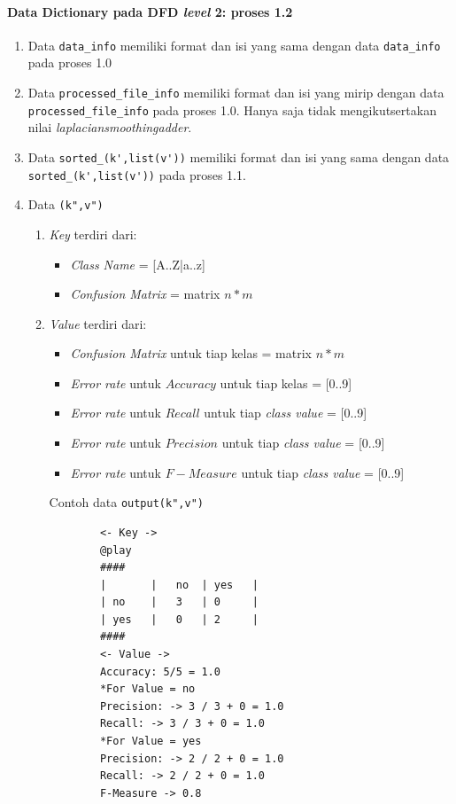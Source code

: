 \paragraph{Data Dictionary pada DFD \textit{level} 2: proses 1.2}
\begin{enumerate}
	\item Data \verb|data_info| memiliki format dan isi yang sama dengan data \verb|data_info| pada proses 1.0
	
	\item Data \verb|processed_file_info|
	memiliki format dan isi yang mirip dengan data \verb|processed_file_info| pada proses 1.0. Hanya saja tidak mengikutsertakan nilai \textit{laplaciansmoothingadder}.

	\item Data \verb|sorted_(k',list(v'))|
	memiliki format dan isi yang sama dengan data \verb|sorted_(k',list(v'))| pada proses 1.1.

	\item Data \verb|(k",v")|
	\begin{enumerate}
		\item \textit{Key} terdiri dari:
		\begin{itemize}
			\item \textit{Class Name} = [A..Z|a..z]
			\item \textit{Confusion Matrix} = matrix $n*m$
		\end{itemize}

		\item \textit{Value} terdiri dari:
		\begin{itemize}
			\item \textit{Confusion Matrix} untuk tiap kelas = matrix $n*m$
			\item \textit{Error rate} untuk $Accuracy$ untuk tiap kelas = [0..9]
			\item \textit{Error rate} untuk $Recall$ untuk tiap \textit{class value} = [0..9]
			\item \textit{Error rate} untuk $Precision$ untuk tiap \textit{class value} = [0..9]
			\item \textit{Error rate} untuk $F-Measure$ untuk tiap \textit{class value} = [0..9]
		\end{itemize}
		Contoh data \verb|output(k",v")|
		\begin{lstlisting}
		<- Key ->
		@play
		####
		|		|	no	| yes	|
		| no	|	3	| 0		|
		| yes	|	0	| 2		|
		####
		<- Value ->
		Accuracy: 5/5 = 1.0
		*For Value = no
		Precision: -> 3 / 3 + 0 = 1.0
		Recall: -> 3 / 3 + 0 = 1.0 
		*For Value = yes
		Precision: -> 2 / 2 + 0 = 1.0
		Recall: -> 2 / 2 + 0 = 1.0
		F-Measure -> 0.8
		\end{lstlisting}
	\end{enumerate}

\end{enumerate}

